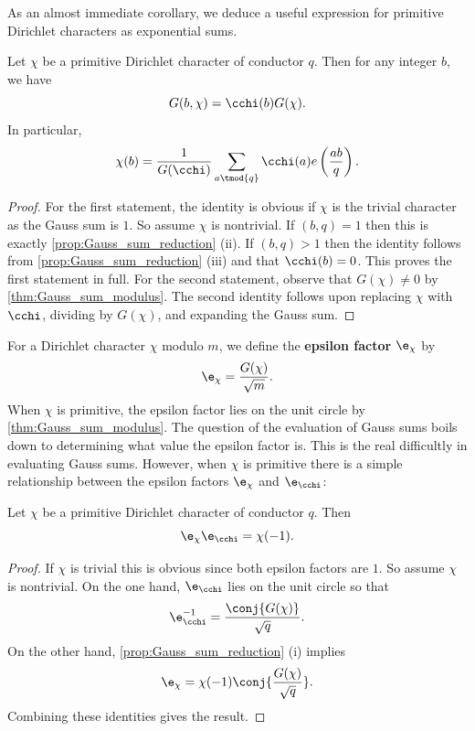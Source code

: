 \documentclass[12pt]{article}
\begin{document}
      As an almost immediate corollary, we deduce a useful expression for primitive Dirichlet characters as exponential sums.

      \begin{corollary}\label{cor:gauss_sum_primitive_formula}
        Let \(\chi\) be a primitive Dirichlet character of conductor \(q\). Then for any integer \(b\), we have
        \[
          G(b,\chi) = \cchi(b)G(\chi).
        \]
        In particular,
        \[
          \chi(b) = \frac{1}{G(\cchi)}\sum_{a \tmod{q}}\cchi(a)e\left(\frac{ab}{q}\right).
        \]
      \end{corollary}
      \begin{proof}
        For the first statement, the identity is obvious if \(\chi\) is the trivial character as the Gauss sum is \(1\). So assume \(\chi\) is nontrivial. If \((b,q) = 1\) then this is exactly \cref{prop:Gauss_sum_reduction} (ii). If \((b,q) > 1\) then the identity follows from \cref{prop:Gauss_sum_reduction} (iii) and that \(\cchi(b) = 0\). This proves the first statement in full. For the second statement, observe that \(G(\chi) \neq 0\) by \cref{thm:Gauss_sum_modulus}. The second identity follows upon replacing \(\chi\) with \(\cchi\), dividing by \(G(\chi)\), and expanding the Gauss sum.
      \end{proof}

      For a Dirichlet character \(\chi\) modulo \(m\), we define the \textbf{epsilon factor} \(\e_{\chi}\) by
      \[
        \e_{\chi} = \frac{G(\chi)}{\sqrt{m}}.
      \]
      When \(\chi\) is primitive, the epsilon factor lies on the unit circle by \cref{thm:Gauss_sum_modulus}. The question of the evaluation of Gauss sums boils down to determining what value the epsilon factor is. This is the real difficultly in evaluating Gauss sums. However, when \(\chi\) is primitive there is a simple relationship between the epsilon factors \(\e_{\chi}\) and \(\e_{\cchi}\):

      \begin{proposition}\label{prop:epsilon_factor_relationship}
        Let \(\chi\) be a primitive Dirichlet character of conductor \(q\). Then
        \[
          \e_{\chi}\e_{\cchi} = \chi(-1).
        \]
      \end{proposition}
      \begin{proof}
        If \(\chi\) is trivial this is obvious since both epsilon factors are \(1\). So assume \(\chi\) is nontrivial. On the one hand, \(\e_{\cchi}\) lies on the unit circle so that
        \[
          \e_{\cchi}^{-1} = \frac{\conj{G(\chi)}}{{\sqrt{q}}}.
        \]
        On the other hand, \cref{prop:Gauss_sum_reduction} (i) implies
        \[
          \e_{\chi} = \chi(-1)\conj{\frac{G(\chi)}{\sqrt{q}}}.
        \]
        Combining these identities gives the result.
      \end{proof}
\end{document}

